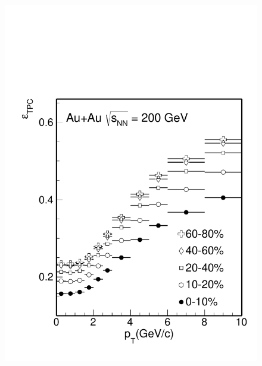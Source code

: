 
\begin{figure}[htbp]
\begin{minipage}[htbp]{0.52\linewidth}
\centering
\includegraphics[width=1.0\textwidth,angle=0]{figure/Run14_D0HFT/Datad0Eff_tpc_10.pdf}

\end{minipage}
\end{figure}

